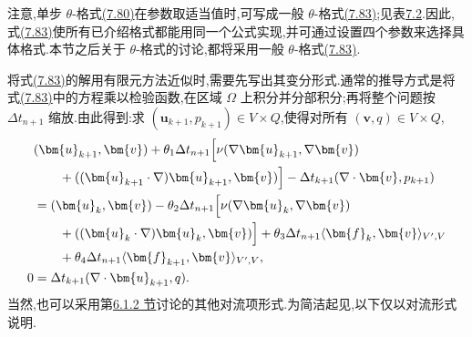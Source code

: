 \begin{note}
\label{note:theta-scheme-comments}
注意,单步 $\theta$-格式\hyperref[eq:theta-scheme-one-step]{(7.80)}在参数取适当值时,可写成一般 $\theta$-格式\hyperref[eq:general-theta-scheme]{(7.83)};见表\hyperref[tab:one-step-theta-parameters]{7.2}.因此,式\hyperref[eq:general-theta-scheme]{(7.83)}使所有已介绍格式都能用同一个公式实现,并可通过设置四个参数来选择具体格式.本节之后关于 $\theta$-格式的讨论,都将采用一般 $\theta$-格式\hyperref[eq:general-theta-scheme]{(7.83)}.

\begin{eleganttable}
\centering
{}
\label{tab:one-step-theta-parameters}
\scriptsize
\setlength{\tabcolsep}{3pt}
\renewcommand{\arraystretch}{1.18}
\end{eleganttable}
\end{note}

\begin{note}[变分形式]
\label{note:general-theta-variational}
将式\hyperref[eq:general-theta-scheme]{(7.83)}的解用有限元方法近似时,需要先写出其变分形式.通常的推导方式是将式\hyperref[eq:general-theta-scheme]{(7.83)}中的方程乘以检验函数,在区域 $\Omega$ 上积分并分部积分;再将整个问题按 $\Delta t_{n+1}$ 缩放.由此得到:求 $(\bm{u}_{k+1},p_{k+1})\in V\times Q$,使得对所有 $(\bm{v},q)\in V\times Q$,
\begin{equation}\label{eq:general-theta-variational}
\begin{aligned}
  &(\bm{u}_{k+1},\bm{v})
     +\theta_1\Delta t_{n+1}\Bigl[
       \nu(\nabla\bm{u}_{k+1},\nabla\bm{v})\\
  &\qquad+((\bm{u}_{k+1}\cdot\nabla)\bm{u}_{k+1},\bm{v})\Bigr]
       -\Delta t_{k+1}(\nabla\cdot\bm{v},p_{k+1})\\
  &=(\bm{u}_k,\bm{v})
       -\theta_2\Delta t_{n+1}\Bigl[
       \nu(\nabla\bm{u}_k,\nabla\bm{v})\\
  &\qquad+((\bm{u}_k\cdot\nabla)\bm{u}_k,\bm{v})\Bigr]
       +\theta_3\Delta t_{n+1}\langle\bm{f}_k,\bm{v}\rangle_{V',V}\\
  &\qquad+\theta_4\Delta t_{n+1}
       \langle\bm{f}_{k+1},\bm{v}\rangle_{V',V},\\
  0&=\Delta t_{k+1}(\nabla\cdot\bm{u}_{k+1},q).
\end{aligned}
\end{equation}
当然,也可以采用第\hyperref[subsec:steady-ns-nonlinear-term]{6.1.2 节}讨论的其他对流项形式.为简洁起见,以下仅以对流形式说明.
\end{note}

